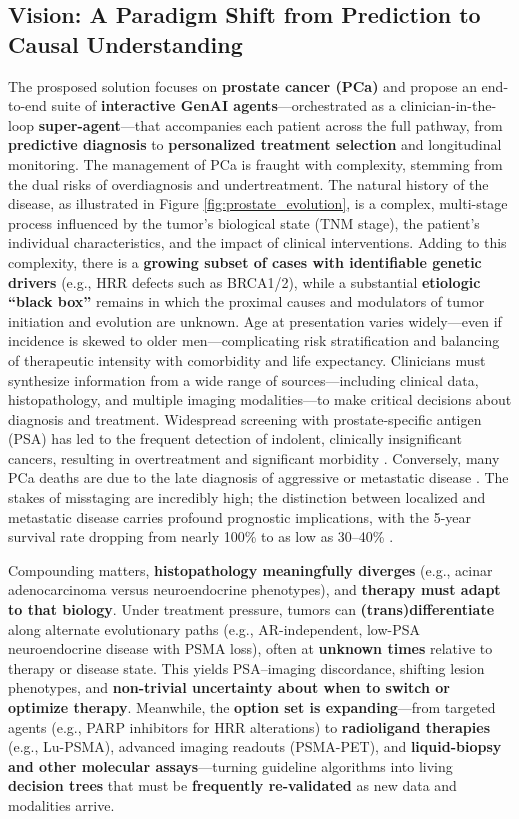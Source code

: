 \documentclass[11pt, a4paper]{article}
\begin{document}
\subsection{Vision: A Paradigm Shift from Prediction to Causal Understanding}
The prosposed solution focuses on \textbf{ prostate cancer (PCa)} and propose an end-to-end suite of \textbf{interactive GenAI agents}—orchestrated as a clinician-in-the-loop \textbf{super-agent}—that accompanies each patient across the full pathway, from \textbf{predictive diagnosis} to \textbf{personalized treatment selection} and longitudinal monitoring. The management of PCa is fraught with complexity, stemming from the dual risks of overdiagnosis and undertreatment. The natural history of the disease, as illustrated in Figure \ref{fig:prostate_evolution}, is a complex, multi-stage process influenced by the tumor’s biological state (TNM stage), the patient’s individual characteristics, and the impact of clinical interventions. Adding to this complexity, there is a \textbf{growing subset of cases with identifiable genetic drivers} (e.g., HRR defects such as BRCA1/2), while a substantial \textbf{etiologic “black box”} remains in which the proximal causes and modulators of tumor initiation and evolution are unknown. Age at presentation varies widely—even if incidence is skewed to older men—complicating risk stratification and balancing of therapeutic intensity with comorbidity and life expectancy. Clinicians must synthesize information from a wide range of sources—including clinical data, histopathology, and multiple imaging modalities—to make critical decisions about diagnosis and treatment. Widespread screening with prostate-specific antigen (PSA) has led to the frequent detection of indolent, clinically insignificant cancers, resulting in overtreatment and significant morbidity \cite{PadhaniSchoots2023,JenaTaneja2018,CaraccioloCastello2022}. Conversely, many PCa deaths are due to the late diagnosis of aggressive or metastatic disease \cite{PadhaniSchoots2023}. The stakes of misstaging are incredibly high; the distinction between localized and metastatic disease carries profound prognostic implications, with the 5-year survival rate dropping from nearly 100\% to as low as 30–40\% \cite{WangODwyer2024,CereserEvangelista2023}.

Compounding matters, \textbf{histopathology meaningfully diverges} (e.g., acinar adenocarcinoma versus neuroendocrine phenotypes), and \textbf{therapy must adapt to that biology}. Under treatment pressure, tumors can \textbf{(trans)differentiate} along alternate evolutionary paths (e.g., AR-independent, low-PSA neuroendocrine disease with PSMA loss), often at \textbf{unknown times} relative to therapy or disease state. This yields PSA–imaging discordance, shifting lesion phenotypes, and \textbf{non-trivial uncertainty about when to switch or optimize therapy}. Meanwhile, the \textbf{option set is expanding}—from targeted agents (e.g., PARP inhibitors for HRR alterations) to \textbf{radioligand therapies} (e.g., Lu-PSMA), advanced imaging readouts (PSMA-PET), and \textbf{liquid-biopsy and other molecular assays}—turning guideline algorithms into living \textbf{decision trees} that must be \textbf{frequently re-validated} as new data and modalities arrive.
\end{document}
